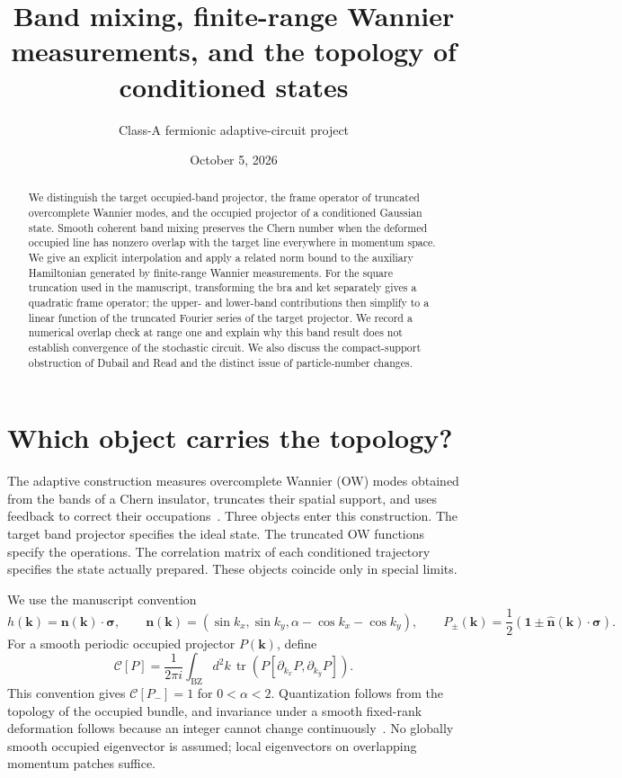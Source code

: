 \documentclass[aps,prb,onecolumn,nofootinbib,superscriptaddress]{revtex4-2}
\newcommand{\id}{\mathbf{1}}
\newcommand{\tr}{\operatorname{tr}}
\newcommand{\bk}{\boldsymbol k}
\newcommand{\C}{\mathcal C}
\newcommand{\BZ}{\mathrm{BZ}}
\begin{document}
\title{Band mixing, finite-range Wannier measurements, and the topology of conditioned states}
\author{Class-A fermionic adaptive-circuit project}
\noaffiliation
\date{October 5, 2026}
\begin{abstract}
We distinguish the target occupied-band projector, the frame operator of truncated overcomplete Wannier modes, and the occupied projector of a conditioned Gaussian state. Smooth coherent band mixing preserves the Chern number when the deformed occupied line has nonzero overlap with the target line everywhere in momentum space. We give an explicit interpolation and apply a related norm bound to the auxiliary Hamiltonian generated by finite-range Wannier measurements. For the square truncation used in the manuscript, transforming the bra and ket separately gives a quadratic frame operator; the upper- and lower-band contributions then simplify to a linear function of the truncated Fourier series of the target projector. We record a numerical overlap check at range one and explain why this band result does not establish convergence of the stochastic circuit. We also discuss the compact-support obstruction of Dubail and Read and the distinct issue of particle-number changes.
\end{abstract}
\maketitle
\setcounter{tocdepth}{2}
\tableofcontents

\section{Which object carries the topology?}

The adaptive construction measures overcomplete Wannier (OW) modes obtained from the bands of a Chern insulator, truncates their spatial support, and uses feedback to correct their occupations~\cite{BPJ}. Three objects enter this construction. The target band projector specifies the ideal state. The truncated OW functions specify the operations. The correlation matrix of each conditioned trajectory specifies the state actually prepared. These objects coincide only in special limits.

We use the manuscript convention
\begin{equation}
 h(\bk)=\boldsymbol n(\bk)\cdot\boldsymbol\sigma,\qquad
 \boldsymbol n(\bk)=(\sin k_x,\sin k_y,\alpha-\cos k_x-\cos k_y),\qquad
 P_\pm(\bk)=\frac12\left(\id\pm\widehat{\boldsymbol n}(\bk)\cdot\boldsymbol\sigma\right).
 \label{eq:model}
\end{equation}
For a smooth periodic occupied projector $P(\bk)$, define
\begin{equation}
 \C[P]=\frac{1}{2\pi i}\int_{\BZ}d^2k\,
 \tr\left(P[\partial_{k_x}P,\partial_{k_y}P]\right).
 \label{eq:chern}
\end{equation}
This convention gives $\C[P_-]=1$ for $0<\alpha<2$. Quantization follows from the topology of the occupied bundle, and invariance under a smooth fixed-rank deformation follows because an integer cannot change continuously~\cite{Avron1983}. No globally smooth occupied eigenvector is assumed; local eigenvectors on overlapping momentum patches suffice.
\end{document}
